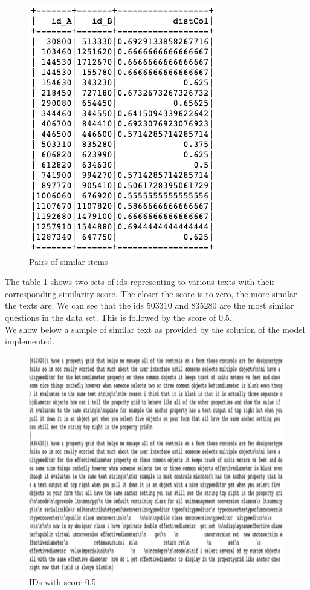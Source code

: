 \documentclass[12pt]{article}
\begin{document}
	\begin{figure}[H]
		\includegraphics[scale=0.9]{similaritem.png}
		\centering
		\caption{Pairs of similar items}
		\label{fig:similaritem}
	\end{figure}
	The table \ref{fig:similaritem} shows two sets of ids representing to various texts with their corresponding similarity score. The closer the score is to zero, the more similar the texts are. We can see that the ids 503310 and 835280 are the most similar questions in the data set. This is followed by the score of 0.5.
\\
	We show below a sample of similar text as provided by the solution of the model implemented.
		\begin{figure}[H]
		\includegraphics[scale=0.9]{sample.png}
		\centering
		\caption{IDs with score 0.5}
		\label{fig:sample}
	\end{figure}
\end{document}
